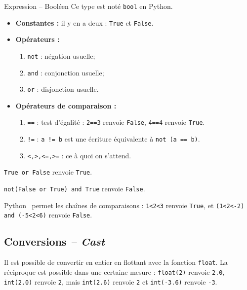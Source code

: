 \begin{defi}{Expression -- Booléen}
Ce type est noté \texttt{bool} en Python.
\begin{itemize}
\item \textbf{Constantes :} il y en a deux : \texttt{True} et \texttt{False}.
\item \textbf{Opérateurs :}
\begin{enumerate}
 \item \texttt{not} : négation usuelle;
 \item \texttt{and} : conjonction usuelle;
 \item \texttt{or} : disjonction usuelle.
\end{enumerate}
\item \textbf{Opérateurs de comparaison :}
\begin{enumerate}
 \item \texttt{==} : test d'égalité : \texttt{2==3} renvoie \texttt{False}, \texttt{4==4} renvoie 
\texttt{True}. %
 \item \texttt{!=} : \texttt{a != b} est une écriture équivalente à \texttt{not (a == b)}.
 \item \texttt{<,>,<=,>=} : ce à quoi on s'attend.
\end{enumerate}
\end{itemize}
\end{defi}


\begin{exemple}
\texttt{True or False} renvoie \texttt{True}. 

\texttt{not(False or True) and True} renvoie \texttt{False}.
\end{exemple}

\begin{rem}
Python \ permet les chaînes de comparaisons : \texttt{1<2<3} renvoie
\texttt{True}, et \texttt{(1<2<-2) and (-5<2<6)} renvoie \texttt{False}.
\end{rem}

\subsection{Conversions \textit{-- Cast}}

Il est possible de convertir en entier en flottant avec la fonction \texttt{float}. La réciproque est possible dans une certaine 
mesure : \texttt{float(2)} renvoie \texttt{2.0}, \texttt{int(2.0)} renvoie \texttt{2}, mais \texttt{int(2.6)} renvoie \texttt{2} et 
\texttt{int(-3.6)} renvoie \texttt{-3}.

